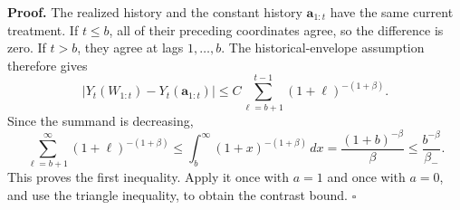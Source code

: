 \textbf{Proof.} The realized history and the constant history \(\mathbf a_{1:t}\) have the same current treatment. If \(t\le b\), all of their preceding coordinates agree, so the difference is zero. If \(t>b\), they agree at lags \(1,\ldots,b\). The historical-envelope assumption therefore gives
\[
\left|Y_t(W_{1:t})-Y_t(\mathbf a_{1:t})\right|
\le C\sum_{\ell=b+1}^{t-1}(1+\ell)^{-(1+\beta)}.
\]
Since the summand is decreasing,
\[
\sum_{\ell=b+1}^{\infty}(1+\ell)^{-(1+\beta)}
\le \int_b^\infty(1+x)^{-(1+\beta)}\,dx
=\frac{(1+b)^{-\beta}}{\beta}
\le \frac{b^{-\beta}}{\beta_-}.
\]
This proves the first inequality. Apply it once with \(a=1\) and once with \(a=0\), and use the triangle inequality, to obtain the contrast bound. \(\square\)